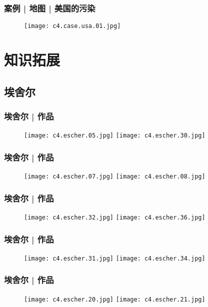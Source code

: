 \begin{frame}
  \frametitle{案例 | 地图 | 美国的污染}
    \begin{figure}
      \centering
      \texttt{[image: c4.case.usa.01.jpg]}
    \end{figure}
\end{frame}

\section{知识拓展}
\subsection{埃舍尔}
\begin{frame}
  \frametitle{埃舍尔 | 作品}
  \begin{figure}
    \centering
    \texttt{[image: c4.escher.05.jpg]}\quad
    \texttt{[image: c4.escher.30.jpg]}
  \end{figure}
\end{frame}

\begin{frame}
  \frametitle{埃舍尔 | 作品}
  \begin{figure}
    \centering
    \texttt{[image: c4.escher.07.jpg]}\quad
    \texttt{[image: c4.escher.08.jpg]}
  \end{figure}
\end{frame}

\begin{frame}
  \frametitle{埃舍尔 | 作品}
  \begin{figure}
    \centering
    \texttt{[image: c4.escher.32.jpg]}\quad
    \texttt{[image: c4.escher.36.jpg]}
  \end{figure}
\end{frame}

\begin{frame}
  \frametitle{埃舍尔 | 作品}
  \begin{figure}
    \centering
    \texttt{[image: c4.escher.31.jpg]}\quad
    \texttt{[image: c4.escher.34.jpg]}
  \end{figure}
\end{frame}

\begin{frame}
  \frametitle{埃舍尔 | 作品}
  \begin{figure}
    \centering
    \texttt{[image: c4.escher.20.jpg]}\quad
    \texttt{[image: c4.escher.21.jpg]}
  \end{figure}
\end{frame}

